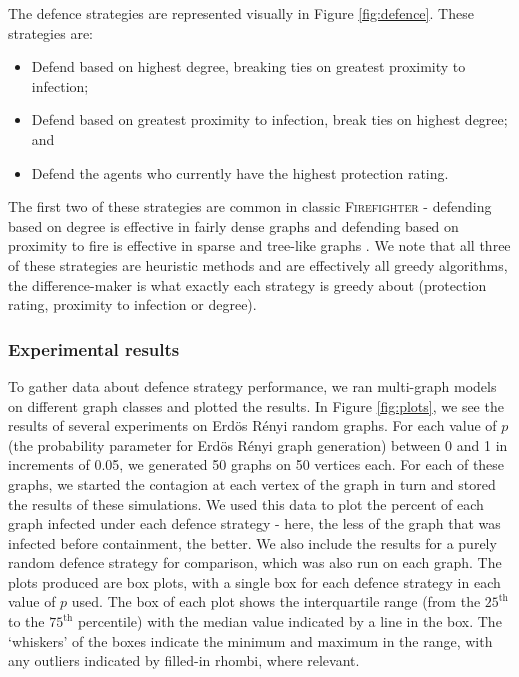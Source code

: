 \documentclass[../report.tex]{subfiles}
\begin{document}
The defence strategies are represented visually in Figure \ref{fig:defence}. These strategies are:
\begin{itemize}
	\item Defend based on highest degree, breaking ties on greatest proximity to infection;
	\item Defend based on greatest proximity to infection, break ties on highest degree; and
	\item Defend the agents who currently have the highest protection rating.
\end{itemize}
The first two of these strategies are common in classic {\scshape Firefighter} - defending based on degree is effective in fairly dense graphs and defending based on proximity to fire is effective in sparse and tree-like graphs \cite{finbow_2009}. We note that all three of these strategies are heuristic methods and are effectively all greedy algorithms, the difference-maker is what exactly each strategy is greedy about (protection rating, proximity to infection or degree).

\subsubsection{Experimental results}

To gather data about defence strategy performance, we ran multi-graph models on different graph classes and plotted the results. In Figure \ref{fig:plots}, we see the results of several experiments on Erd\"{o}s R\'{e}nyi random graphs. For each value of $p$ (the probability parameter for Erd\"{o}s R\'{e}nyi graph generation) between 0 and 1 in increments of 0.05, we generated 50 graphs on 50 vertices each. For each of these graphs, we started the contagion at each vertex of the graph in turn and stored the results of these simulations. We used this data to plot the percent of each graph infected under each defence strategy - here, the less of the graph that was infected before containment, the better. We also include the results for a purely random defence strategy for comparison, which was also run on each graph. The plots produced are box plots, with a single box for each defence strategy in each value of $p$ used. The box of each plot shows the interquartile range (from the $25^\text{th}$ to the $75^\text{th}$ percentile) with the median value indicated by a line in the box. The `whiskers' of the boxes indicate the minimum and maximum in the range, with any outliers indicated by filled-in rhombi, where relevant.
\end{document}
